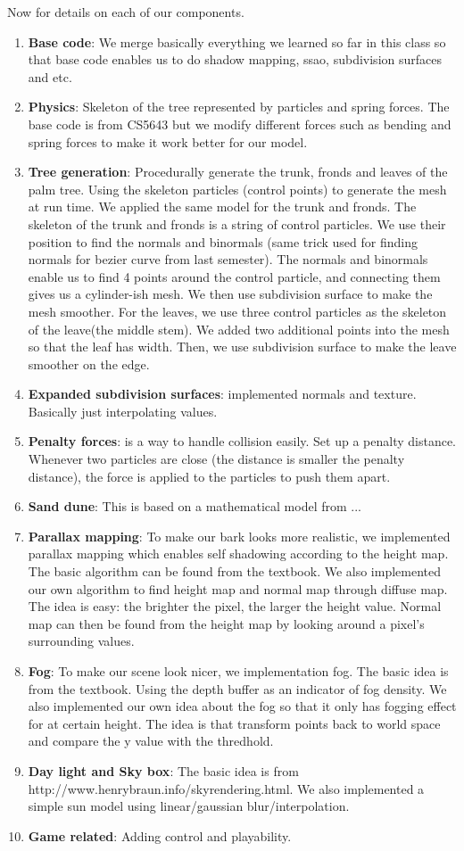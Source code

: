 \documentclass[annual]{acmsiggraph}
\begin{document}
Now for details on each of our components.
\begin{enumerate}
\item{\textbf{Base code}: We merge basically everything we learned so far in this class so that base code enables us to do shadow mapping, ssao, subdivision surfaces and etc.}
\item{\textbf{Physics}: Skeleton of the tree represented by particles and spring forces. The base code is from CS5643 but we modify different forces such as bending and spring forces to make it work better for our model.}
\item{\textbf{Tree generation}: Procedurally generate the trunk, fronds and leaves of the palm tree. Using the skeleton particles (control points) to generate the mesh at run time. We applied the same model for the trunk and fronds. The skeleton of the trunk and fronds is a string of control particles. We use their position to find the normals and binormals (same trick used for finding normals for bezier curve from last semester). The normals and binormals enable us to find 4 points around the control particle, and connecting them gives us a cylinder-ish mesh. We then use subdivision surface to make the mesh smoother. For the leaves, we use three control particles as the skeleton of the leave(the middle stem). We added two additional points into the mesh so that the leaf has width. Then, we use subdivision surface to make the leave smoother on the edge.}
\item{\textbf{Expanded subdivision surfaces}: implemented normals and texture. Basically just interpolating values.}
\item{\textbf{Penalty forces}: is a way to handle collision easily. Set up a penalty distance. Whenever two particles are close (the distance is smaller the penalty distance), the force is applied to the particles to push them apart.}
\item{\textbf{Sand dune}: This is based on a mathematical model from ...}
\item{\textbf{Parallax mapping}: To make our bark looks more realistic, we implemented parallax mapping which enables self shadowing according to the height map. The basic algorithm can be found from the textbook. We also implemented our own algorithm to find height map and normal map through diffuse map. The idea is easy: the brighter the pixel, the larger the height value. Normal map can then be found from the height map by looking around a pixel's surrounding values.}
\item{\textbf{Fog}: To make our scene look nicer, we implementation fog. The basic idea is from the textbook. Using the depth buffer as an indicator of fog density. We also implemented our own idea about the fog so that it only has fogging effect for at certain height. The idea is that transform points back to world space and compare the y value with the thredhold.}
\item{\textbf{Day light and Sky box}: The basic idea is from http://www.henrybraun.info/skyrendering.html. We also implemented a simple sun model using linear/gaussian blur/interpolation.}
\item{\textbf{Game related}: Adding control and playability. }
\end{enumerate}
\end{document}
